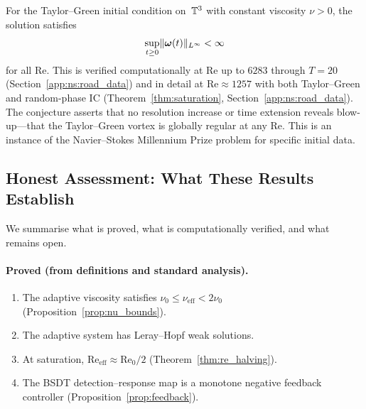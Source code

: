 \begin{conjecture}
\label{conj:saturation}
For the Taylor--Green initial condition on~$\mathbb{T}^3$ with
constant viscosity $\nu > 0$, the solution satisfies
\[
  \sup_{t \ge 0}\lVert \bm{\omega}(t) \rVert_{L^\infty} < \infty
\]
for all $\mathrm{Re}$.  This is verified computationally at
$\mathrm{Re}$ up to $6283$ through $T=20$
(Section~\ref{app:ns:road_data}) and in detail at
$\mathrm{Re} \approx 1257$ with both Taylor--Green and
random-phase IC (Theorem~\ref{thm:saturation},
Section~\ref{app:ns:road_data}).  The conjecture
asserts that no resolution increase or time extension
reveals blow-up---that the Taylor--Green vortex is
globally regular at any Re.  This is an instance of the
Navier--Stokes Millennium Prize problem for specific
initial data.
\end{conjecture}

\subsection{Honest Assessment: What These Results Establish}
\label{app:ns:assessment}

We summarise what is proved, what is computationally verified,
and what remains open.

\paragraph{Proved (from definitions and standard analysis).}
\begin{enumerate}
\item The adaptive viscosity satisfies $\nu_0 \le \nu_{\mathrm{eff}}
  < 2\nu_0$ (Proposition~\ref{prop:nu_bounds}).
\item The adaptive system has Leray--Hopf weak solutions.
\item At saturation, $\mathrm{Re}_{\mathrm{eff}} \approx
  \mathrm{Re}_0 / 2$ (Theorem~\ref{thm:re_halving}).
\item The BSDT detection--response map is a monotone negative
  feedback controller (Proposition~\ref{prop:feedback}).
\end{enumerate}

